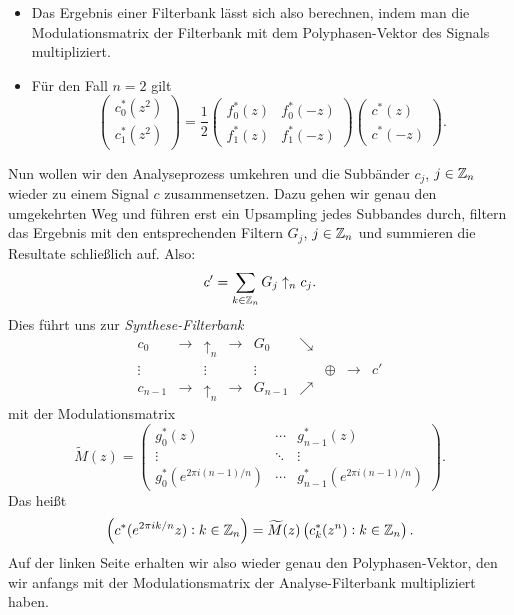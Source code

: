 \begin{remark} \leavevmode
\begin{itemize}
\item Das Ergebnis einer Filterbank lässt sich also berechnen, indem man die Modulationsmatrix der
  Filterbank mit dem Polyphasen-Vektor des Signals multipliziert.
\item Für den Fall $ n = 2 $ gilt
  \[
    \begin{pmatrix}
      c_{0}^{*}(z^{2}) \\
      c_{1}^{*}(z^{2})
    \end{pmatrix}
  = \frac{1}{2}
    \begin{pmatrix}
      f_{0}^{*}(z) & f_{0}^{*}(-z) \\
      f_{1}^{*}(z) & f_{1}^{*}(-z)
    \end{pmatrix}
    \begin{pmatrix}
      c^{*}(z) \\
      c^{*}(-z)
    \end{pmatrix}.
  \]
\end{itemize}
\end{remark}

Nun wollen wir den Analyseprozess umkehren und die Subbänder $ c_{j} $, $ j \in \mathbb{Z}_{n} $ wieder zu
einem Signal $ c $ zusammensetzen. Dazu gehen wir genau den umgekehrten Weg und führen erst ein
Upsampling jedes Subbandes durch, filtern das Ergebnis mit den entsprechenden Filtern $ G_{j} $,
$ j \in \mathbb{Z}_{n} $ und summieren die Resultate schließlich auf. Also:
\[
  c' = \sum_{k \in \mathbb{Z}_{n}} G_{j} \uparrow_{n} c_{j}.
\]
Dies führt uns zur \emph{Synthese-Filterbank}
\[
  \begin{array}{*{9}{c}}
    c_{0} & \rightarrow & \boxed{\uparrow_{n}} & \rightarrow & \boxed{G_{0}} & \searrow & & \\
    \vdots & & \vdots & & \vdots & & \oplus & \rightarrow & c' \\
    c_{n-1} & \rightarrow & \boxed{\uparrow_{n}} & \rightarrow & \boxed{G_{n-1}} & \nearrow & &
  \end{array}
\]
mit der Modulationsmatrix
\[
  \widetilde{M}(z) = \begin{pmatrix}
    g_{0}^{*}(z) & \cdots & g_{n-1}^{*}(z) \\
    \vdots & \ddots & \vdots \\
    g_{0}^{*}(e^{2\pi i(n-1)/n}) & \cdots & g_{n-1}^{*}(e^{2\pi i(n-1)/n})
  \end{pmatrix}.
\]
Das heißt
\[
    \left( c^{*}(e^{2\pi ik/n}z) : k \in \mathbb{Z}_{n} \right)
  = \widetilde{M}(z) \left( c^{*}_{k}(z^{n}) : k \in \mathbb{Z}_{n} \right).
\]
Auf der linken Seite erhalten wir also wieder genau den Polyphasen-Vektor, den wir anfangs mit der 
Modulationsmatrix der Analyse-Filterbank multipliziert haben.


